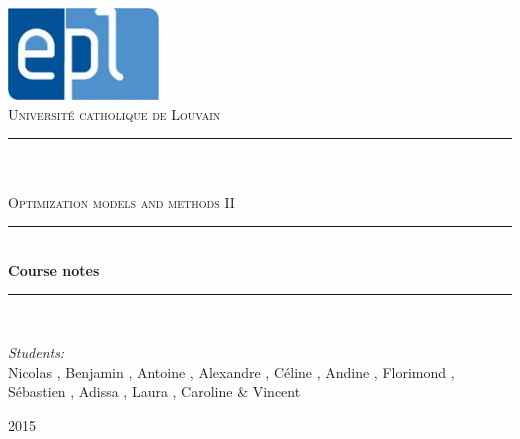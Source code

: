 \newcommand{\HRule}{\rule{\linewidth}{0.5mm}}

\begin{titlepage}
	
\begin{center}

\includegraphics[width=0.30\textwidth]{images/epl.jpg}\\[1cm]    

\textsc{\LARGE Universit\'e catholique de Louvain}\\[1.5cm]

\HRule \\[0.5cm]

\textsc{\Large {}}\\[0.2cm]
\textsc{\Large Optimization models and methods II}\\[0.5cm]


\HRule \\[2cm]
{\huge \bfseries Course notes}\\[1cm]

\HRule \\[1.5cm]

\begin{minipage}{0.8\textwidth}
\begin{flushleft} \large
\emph{Students:}\\
Nicolas , Benjamin , Antoine , Alexandre , Céline , Andine , Florimond , Sébastien , Adissa , Laura , Caroline  \& Vincent 
\end{flushleft}
\end{minipage}


\vfill

{\large  2015}

\end{center}	
	
	
\end{titlepage}
